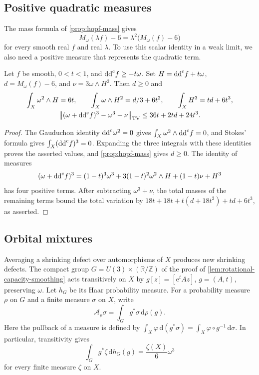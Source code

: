 \subsection{Positive quadratic measures}

The mass formula of \cref{prop:hopf-mass} gives
\[
 M_\omega(\lambda f)-6=\lambda^2\bigl(M_\omega(f)-6\bigr)
\]
for every smooth real $f$ and real $\lambda$. To use this scalar identity in a weak limit, we also need a positive measure that represents the quadratic term.

\begin{lemma}\label{lem:hopf-positive-quadratic-measure}
Let $f$ be smooth, $0<t<1$, and $\mathrm{dd}^{\mathrm{c}} f\geq-t\omega$. Set $H=\mathrm{dd}^{\mathrm{c}} f+t\omega$, $d=M_\omega(f)-6$, and $\nu=3\omega\wedge H^2$. Then $d\geq0$ and
\[
 \begin{gathered}
 \int_X\omega^2\wedge H=6t,\qquad
 \int_X\omega\wedge H^2=d/3+6t^2,\qquad
 \int_XH^3=td+6t^3,\\
 \bigl\|(\omega+\mathrm{dd}^{\mathrm{c}} f)^3-\omega^3-\nu\bigr\|_{\mathrm{TV}}
 \leq36t+2td+24t^3.
 \end{gathered}
\]
\end{lemma}
\begin{proof}
The Gauduchon identity $\mathrm{dd}^{\mathrm{c}}\omega^2=0$ gives $\int_X\omega^2\wedge\mathrm{dd}^{\mathrm{c}} f=0$, and Stokes' formula gives $\int_X(\mathrm{dd}^{\mathrm{c}} f)^3=0$. Expanding the three integrals with these identities proves the asserted values, and \cref{prop:hopf-mass} gives $d\geq0$. The identity of measures
\[
 (\omega+\mathrm{dd}^{\mathrm{c}} f)^3
 =(1-t)^3\omega^3+3(1-t)^2\omega^2\wedge H
   +(1-t)\nu+H^3
\]
has four positive terms. After subtracting $\omega^3+\nu$, the total masses of the remaining terms bound the total variation by $18t+18t+t(d+18t^2)+td+6t^3$, as asserted.
\end{proof}

\subsection{Orbital mixtures}

Averaging a shrinking defect over automorphisms of $X$ produces new shrinking defects. The compact group $G=U(3)\times(\mathbb R/\mathbb Z)$ of the proof of \cref{lem:rotational-capacity-smoothing} acts transitively on $X$ by $g[z]=[\mathrm{e}^tAz]$, $g=(A,t)$, preserving $\omega$. Let $h_G$ be its Haar probability measure. For a probability measure $\rho$ on $G$ and a finite measure $\sigma$ on $X$, write
\[
 \mathcal A_\rho\sigma=\int_Gg^*\sigma\,\mathrm{d}\rho(g).
\]
Here the pullback of a measure is defined by $\int_X\varphi\,\mathrm{d}(g^*\sigma)=\int_X\varphi\circ g^{-1}\,\mathrm{d}\sigma$. In particular, transitivity gives
\[
 \int_Gg^*\zeta\,\mathrm{d}h_G(g)
 =\frac{\zeta(X)}6\omega^3
\]
for every finite measure $\zeta$ on $X$.

